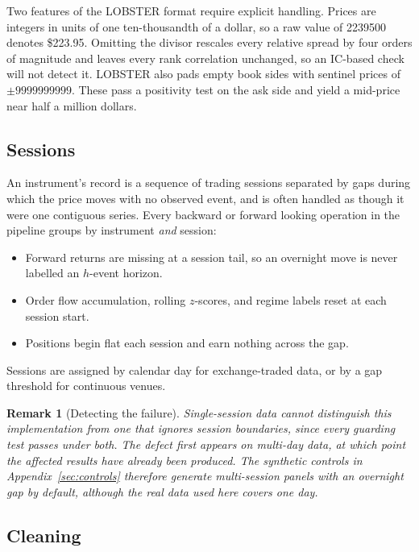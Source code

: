 \documentclass[11pt]{scrartcl}
\newtheorem{remark}{Remark}[section]
\begin{document}
Two features of the LOBSTER format require explicit handling. Prices are integers in units of one ten-thousandth of a dollar, so a raw value of 2239500 denotes \$223.95. Omitting the divisor rescales every relative spread by four orders of magnitude and leaves every rank correlation unchanged, so an IC-based check will not detect it. LOBSTER also pads empty book sides with sentinel prices of $\pm 9999999999$. These pass a positivity test on the ask side and yield a mid-price near half a million dollars.

\subsection{Sessions}
\label{sec:sessions}

An instrument's record is a sequence of trading sessions separated by gaps during which the price moves with no observed event, and is often handled as though it were one contiguous series. Every backward or forward looking operation in the pipeline groups by instrument \emph{and} session:

\begin{itemize}
\item Forward returns are missing at a session tail, so an overnight move is never labelled an $h$-event horizon.
\item Order flow accumulation, rolling $z$-scores, and regime labels reset at each session start.
\item Positions begin flat each session and earn nothing across the gap.
\end{itemize}

Sessions are assigned by calendar day for exchange-traded data, or by a gap threshold for continuous venues.

\begin{remark}[Detecting the failure]
Single-session data cannot distinguish this implementation from one that ignores session boundaries, since every guarding test passes under both. The defect first appears on multi-day data, at which point the affected results have already been produced. The synthetic controls in Appendix~\ref{sec:controls} therefore generate multi-session panels with an overnight gap by default, although the real data used here covers one day.
\end{remark}

\subsection{Cleaning}
\label{sec:cleaning}
\end{document}
